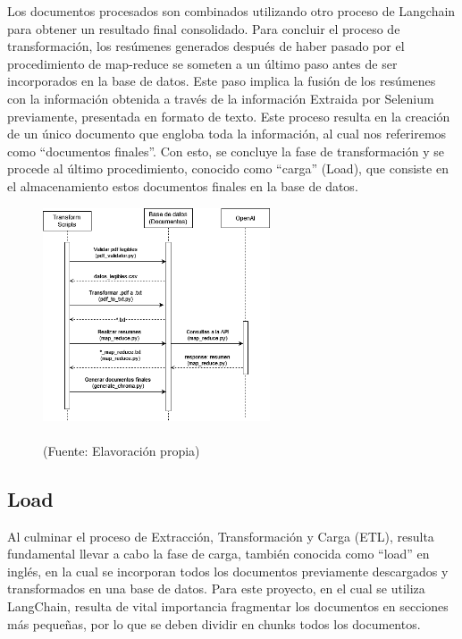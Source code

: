 \par Los documentos procesados son combinados utilizando otro proceso de Langchain para obtener un resultado final consolidado. 
Para concluir el proceso de transformación, los resúmenes generados después de haber pasado por el procedimiento de map-reduce 
se someten a un último paso antes de ser incorporados en la base de datos. Este paso implica la fusión de los resúmenes con la 
información obtenida a través de la información Extraida por Selenium previamente, presentada en formato de texto. Este proceso 
resulta en la creación de un único documento que engloba toda la información, al cual nos referiremos como ``documentos finales''. 
Con esto, se concluye la fase de transformación y se procede al último procedimiento, conocido como ``carga'' (Load), que consiste 
en el almacenamiento estos documentos finales en la base de datos.


\begin{figure}[ht!]
    \centering
    \includegraphics[width=0.6\textwidth]{figures/transfrom_diagram.png}
    \caption[]{\\
    {\scriptsize (Fuente: Elavoración propia)}}
    \label{fig:chatbot1}
\end{figure}

\subsection{Load}

\par Al culminar el proceso de Extracción, Transformación y Carga (ETL), resulta fundamental llevar a cabo la fase de carga, 
también conocida como ``load'' en inglés, en la cual se incorporan todos los documentos previamente descargados y transformados 
en una base de datos. Para este proyecto, en el cual se utiliza LangChain, resulta de vital importancia fragmentar los documentos 
en secciones más pequeñas, por lo que se deben dividir en chunks todos los documentos.

